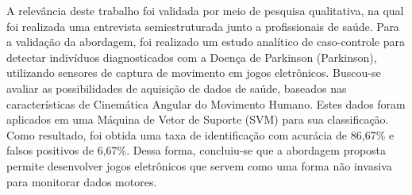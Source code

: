 
A relevância deste trabalho foi validada por meio de pesquisa qualitativa, na qual foi realizada uma entrevista semiestruturada junto a profissionais de saúde. Para a validação da abordagem, foi realizado um estudo analítico de caso-controle para detectar indivíduos diagnosticados com a Doença de Parkinson (Parkinson), utilizando sensores de captura de movimento em jogos eletrônicos. Buscou-se avaliar as possibilidades de aquisição de dados de saúde, baseados nas características de Cinemática Angular do Movimento Humano. Estes dados foram aplicados em uma Máquina de Vetor de Suporte (SVM) para sua classificação. Como resultado, foi obtida uma taxa de identificação com acurácia de 86,67\% e falsos positivos de 6,67\%. Dessa forma, concluiu-se que a abordagem proposta permite desenvolver jogos eletrônicos que servem como uma forma não invasiva para monitorar dados motores.



